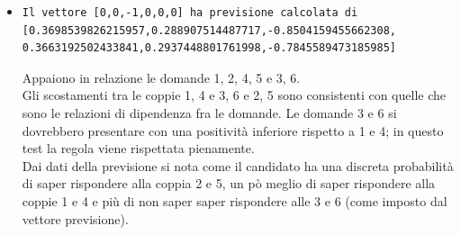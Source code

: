\begin{itemize}
\item \begin{verbatim}Il vettore [0,0,-1,0,0,0] ha previsione calcolata di
[0.3698539826215957,0.288907514487717,-0.8504159455662308,
0.3663192502433841,0.2937448801761998,-0.7845589473185985]
\end{verbatim}
Appaiono in relazione le domande 1, 2, 4, 5 e 3, 6.\\
Gli scostamenti tra le coppie 1, 4 e 3, 6  e 2, 5 sono consistenti con quelle che sono le relazioni di dipendenza fra le domande.
Le domande 3 e 6 si dovrebbero presentare con una positivit\`a inferiore rispetto a 1 e 4; in questo test la regola viene rispettata pienamente.\\
Dai dati della previsione si nota come il candidato ha una discreta probabilit\`a di saper rispondere alla coppia 2 e 5, un p\`o meglio di saper rispondere alla coppie 1 e 4 e pi\`u di non saper saper rispondere alle 3 e 6 (come imposto dal vettore previsione).
\end{itemize}


